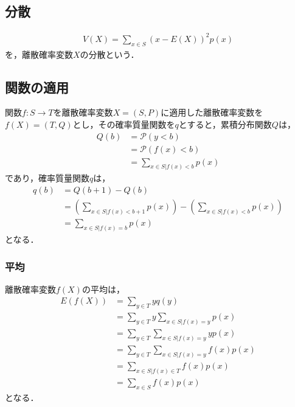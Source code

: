 \documentclass[dvipdfmx]{jsarticle}
\begin{document}
 \subsection{分散}
 \begin{align}
  V\left(X\right)=\sum_{x\in S}\left(x-E\left(X\right)\right)^2p\left(x\right)
 \end{align}
を，離散確率変数$X$の分散という．
 \subsection{関数の適用}
関数$f:S\to T$を離散確率変数$X=\left(S,P\right)$に適用した離散確率変数を$f\left(X\right)=\left(T,Q\right)$とし，その確率質量関数を$q$とすると，累積分布関数$Q$は，
 \begin{align}
  Q\left(b\right)&=\mathscr{P}\left(y<b\right)\nonumber\\
  &=\mathscr{P}\left(f\left(x\right)<b\right)\nonumber\\
  &=\sum_{x\in S|f\left(x\right)<b}p\left(x\right)
 \end{align}
であり，確率質量関数$q$は，
 \begin{align}
  q\left(b\right)&=Q\left(b+1\right)-Q\left(b\right)\nonumber\\
  &=\left(\sum_{x\in S|f\left(x\right)<b+1}p\left(x\right)\right)-\left(\sum_{x\in S|f\left(x\right)<b}p\left(x\right)\right)\nonumber\\
  &=\sum_{x\in S|f\left(x\right)=b}p\left(x\right)
 \end{align}
となる．
 \subsubsection{平均}
離散確率変数$f\left(X\right)$の平均は，
 \begin{align}
  E\left(f\left(X\right)\right)&=\sum_{y\in T}yq\left(y\right)\nonumber\\
  &=\sum_{y\in T}y\sum_{x\in S|f\left(x\right)=y}p\left(x\right)\nonumber\\
  &=\sum_{y\in T}\sum_{x\in S|f\left(x\right)=y}yp\left(x\right)\nonumber\\
  &=\sum_{y\in T}\sum_{x\in S|f\left(x\right)=y}f\left(x\right)p\left(x\right)\nonumber\\
  &=\sum_{x\in S|f\left(x\right)\in T}f\left(x\right)p\left(x\right)\nonumber\\
  &=\sum_{x\in S}f\left(x\right)p\left(x\right)\label{DiscreteFunctionAverage}
 \end{align}
となる．
\end{document}
